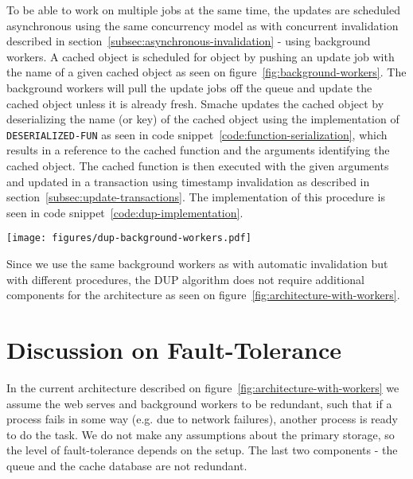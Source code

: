 To be able to work on multiple jobs at the same time, the updates are scheduled asynchronous using the same concurrency model as with concurrent invalidation described in section~\ref{subsec:asynchronous-invalidation} - using background workers. A cached object is scheduled for object by pushing an update job with the name of a given cached object as seen on figure~\ref{fig:background-workers}. The background workers will pull the update jobs off the queue and update the cached object unless it is already fresh. Smache updates the cached object by deserializing the name (or key) of the cached object using the implementation of \verb$DESERIALIZED-FUN$ as seen in code snippet~\ref{code:function-serialization}, which results in a reference to the cached function and the arguments identifying the cached object. The cached function is then executed with the given arguments and updated in a transaction using timestamp invalidation as described in section~\ref{subsec:update-transactions}. The implementation of this procedure is seen in code snippet~\ref{code:dup-implementation}.

\begin{figure*}[ht!]
  \centering
  \texttt{[image: figures/dup-background-workers.pdf]}
  \caption{How Smache schedules cached objects to be updated using background workers}
  \label{fig:dup-background-workers}
\end{figure*}

\begin{figure*}[ht!]
  \centering
  
  \caption{The code for updating a cached object identified by the key (name).}
  \label{code:dup-implementation}
\end{figure*}

Since we use the same background workers as with automatic invalidation but with different procedures, the DUP algorithm does not require additional components for the architecture as seen on figure~\ref{fig:architecture-with-workers}.


\section{Discussion on Fault-Tolerance}
\label{sec:discussion-on-fault-tolerance}

In the current architecture described on figure~\ref{fig:architecture-with-workers} we assume the web serves and background workers to be redundant, such that if a process fails in some way (e.g. due to network failures), another process is ready to do the task. We do not make any assumptions about the primary storage, so the level of fault-tolerance depends on the setup. The last two components - the queue and the cache database are not redundant.

